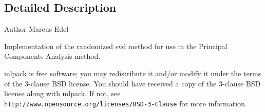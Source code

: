 \subsection{Detailed Description}
\begin{DoxyAuthor}{Author}
Marcus Edel
\end{DoxyAuthor}
Implementation of the randomized svd method for use in the Principal Components Analysis method.

mlpack is free software; you may redistribute it and/or modify it under the terms of the 3-\/clause B\+SD license. You should have received a copy of the 3-\/clause B\+SD license along with mlpack. If not, see {\tt http\+://www.\+opensource.\+org/licenses/\+B\+S\+D-\/3-\/\+Clause} for more information. 